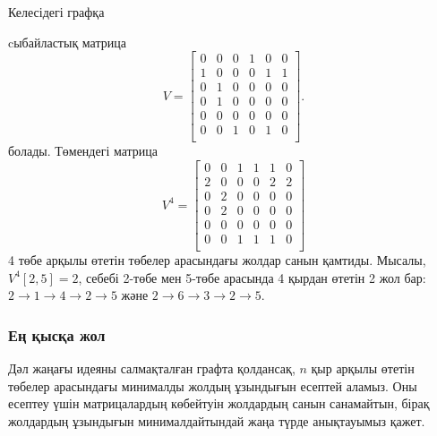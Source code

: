 Келесідегі графқа
\begin{center}
\end{center}
cыбайластық матрица 
\[
V= \begin{bmatrix}
  0 & 0 & 0 & 1 & 0 & 0 \\
  1 & 0 & 0 & 0 & 1 & 1 \\
  0 & 1 & 0 & 0 & 0 & 0 \\
  0 & 1 & 0 & 0 & 0 & 0 \\
  0 & 0 & 0 & 0 & 0 & 0 \\
  0 & 0 & 1 & 0 & 1 & 0 \\
 \end{bmatrix}.
\]
болады. Төмендегі матрица
\[
V^4= \begin{bmatrix}
  0 & 0 & 1 & 1 & 1 & 0 \\
  2 & 0 & 0 & 0 & 2 & 2 \\
  0 & 2 & 0 & 0 & 0 & 0 \\
  0 & 2 & 0 & 0 & 0 & 0 \\
  0 & 0 & 0 & 0 & 0 & 0 \\
  0 & 0 & 1 & 1 & 1 & 0 \\
 \end{bmatrix}
\]
4 төбе арқылы өтетін төбелер арасындағы
жолдар санын қамтиды.
Мысалы, $V^4[2,5]=2$,
себебі 2-төбе мен 5-төбе арасында 
4 қырдан өтетін 2 жол бар:
$2 \rightarrow 1 \rightarrow 4 \rightarrow 2 \rightarrow 5$
және 
$2 \rightarrow 6 \rightarrow 3 \rightarrow 2 \rightarrow 5$.

\subsubsection{Ең қысқа жол}

Дәл жаңағы идеяны салмақталған графта қолдансақ,
$n$ қыр арқылы өтетін төбелер арасындағы минималды жолдың ұзындығын 
есептей аламыз.
Оны есептеу үшін матрицалардың көбейтуін  жолдардың санын санамайтын, бірақ 
жолдардың ұзындығын минималдайтындай жаңа түрде 
анықтауымыз қажет.

